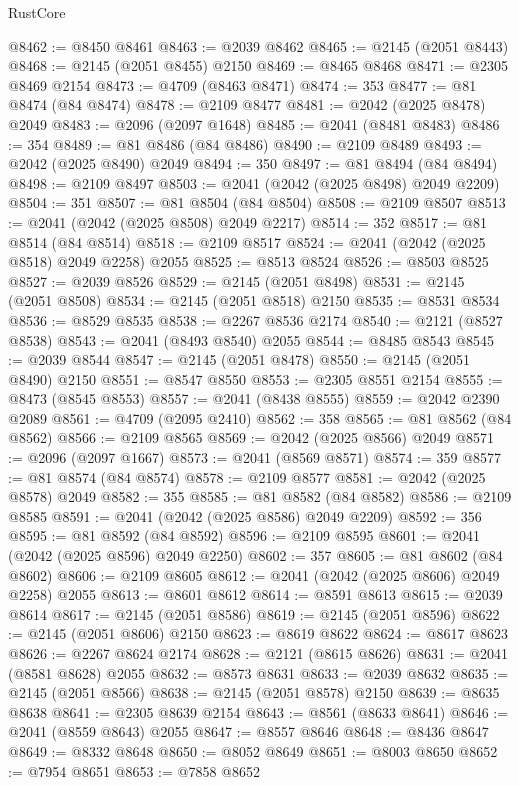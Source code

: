 \begin{lexlean}{RustCore}
\begin{coremodule}
@8462 := @8450 @8461
@8463 := @2039 @8462
@8465 := @2145 (@2051 @8443)
@8468 := @2145 (@2051 @8455) @2150
@8469 := @8465 @8468
@8471 := @2305 @8469 @2154
@8473 := @4709 (@8463 @8471)
@8474 := 353
@8477 := @81 @8474 (@84 @8474)
@8478 := @2109 @8477
@8481 := @2042 (@2025 @8478) @2049
@8483 := @2096 (@2097 @1648)
@8485 := @2041 (@8481 @8483)
@8486 := 354
@8489 := @81 @8486 (@84 @8486)
@8490 := @2109 @8489
@8493 := @2042 (@2025 @8490) @2049
@8494 := 350
@8497 := @81 @8494 (@84 @8494)
@8498 := @2109 @8497
@8503 := @2041 (@2042 (@2025 @8498) @2049 @2209)
@8504 := 351
@8507 := @81 @8504 (@84 @8504)
@8508 := @2109 @8507
@8513 := @2041 (@2042 (@2025 @8508) @2049 @2217)
@8514 := 352
@8517 := @81 @8514 (@84 @8514)
@8518 := @2109 @8517
@8524 := @2041 (@2042 (@2025 @8518) @2049 @2258) @2055
@8525 := @8513 @8524
@8526 := @8503 @8525
@8527 := @2039 @8526
@8529 := @2145 (@2051 @8498)
@8531 := @2145 (@2051 @8508)
@8534 := @2145 (@2051 @8518) @2150
@8535 := @8531 @8534
@8536 := @8529 @8535
@8538 := @2267 @8536 @2174
@8540 := @2121 (@8527 @8538)
@8543 := @2041 (@8493 @8540) @2055
@8544 := @8485 @8543
@8545 := @2039 @8544
@8547 := @2145 (@2051 @8478)
@8550 := @2145 (@2051 @8490) @2150
@8551 := @8547 @8550
@8553 := @2305 @8551 @2154
@8555 := @8473 (@8545 @8553)
@8557 := @2041 (@8438 @8555)
@8559 := @2042 @2390 @2089
@8561 := @4709 (@2095 @2410)
@8562 := 358
@8565 := @81 @8562 (@84 @8562)
@8566 := @2109 @8565
@8569 := @2042 (@2025 @8566) @2049
@8571 := @2096 (@2097 @1667)
@8573 := @2041 (@8569 @8571)
@8574 := 359
@8577 := @81 @8574 (@84 @8574)
@8578 := @2109 @8577
@8581 := @2042 (@2025 @8578) @2049
@8582 := 355
@8585 := @81 @8582 (@84 @8582)
@8586 := @2109 @8585
@8591 := @2041 (@2042 (@2025 @8586) @2049 @2209)
@8592 := 356
@8595 := @81 @8592 (@84 @8592)
@8596 := @2109 @8595
@8601 := @2041 (@2042 (@2025 @8596) @2049 @2250)
@8602 := 357
@8605 := @81 @8602 (@84 @8602)
@8606 := @2109 @8605
@8612 := @2041 (@2042 (@2025 @8606) @2049 @2258) @2055
@8613 := @8601 @8612
@8614 := @8591 @8613
@8615 := @2039 @8614
@8617 := @2145 (@2051 @8586)
@8619 := @2145 (@2051 @8596)
@8622 := @2145 (@2051 @8606) @2150
@8623 := @8619 @8622
@8624 := @8617 @8623
@8626 := @2267 @8624 @2174
@8628 := @2121 (@8615 @8626)
@8631 := @2041 (@8581 @8628) @2055
@8632 := @8573 @8631
@8633 := @2039 @8632
@8635 := @2145 (@2051 @8566)
@8638 := @2145 (@2051 @8578) @2150
@8639 := @8635 @8638
@8641 := @2305 @8639 @2154
@8643 := @8561 (@8633 @8641)
@8646 := @2041 (@8559 @8643) @2055
@8647 := @8557 @8646
@8648 := @8436 @8647
@8649 := @8332 @8648
@8650 := @8052 @8649
@8651 := @8003 @8650
@8652 := @7954 @8651
@8653 := @7858 @8652

\end{coremodule}
\end{lexlean}
